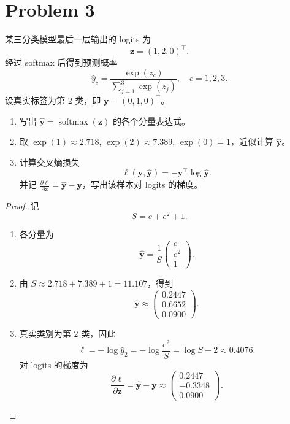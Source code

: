 \section*{Problem 3}

某三分类模型最后一层输出的 logits 为
\[
\bm{z} = (1, 2, 0)^\top.
\]
经过 softmax 后得到预测概率
\[
\hat{y}_c = \frac{\exp(z_c)}{\sum_{j=1}^{3} \exp(z_j)},\quad c = 1, 2, 3.
\]
设真实标签为第 2 类，即 $\bm{y} = (0, 1, 0)^\top$。
\begin{enumerate}
    \item 写出 $\hat{\bm{y}} = \operatorname{softmax}(\bm{z})$ 的各个分量表达式。
    \item 取 $\exp(1) \approx 2.718$, $\exp(2) \approx 7.389$, $\exp(0) = 1$，近似计算 $\hat{\bm{y}}$。
    \item 计算交叉熵损失
    \[
    \ell(\bm{y}, \hat{\bm{y}}) = -\bm{y}^\top \log \hat{\bm{y}}.
    \]
    并记 $\frac{\partial \ell}{\partial \bm{z}} = \hat{\bm{y}} - \bm{y}$，写出该样本对 logits 的梯度。
\end{enumerate}

\begin{proof}
    记
    \[
        S=e+e^2+1.
    \]
    \begin{enumerate}
        \item 各分量为
        \[
            \hat{\bm{y}}
            = \frac{1}{S}\begin{pmatrix}e\\e^2\\1\end{pmatrix}.
        \]
        \item 由 $S\approx2.718+7.389+1=11.107$，得到
        \[
            \hat{\bm{y}}
            \approx \boxed{\begin{pmatrix}0.2447\\0.6652\\0.0900\end{pmatrix}}.
        \]
        \item 真实类别为第 $2$ 类，因此
        \[
            \ell=-\log\hat y_2
            =-\log\frac{e^2}{S}
            =\log S-2
            \approx \boxed{0.4076}.
        \]
        对 logits 的梯度为
        \[
            \frac{\partial\ell}{\partial\bm{z}}
            =\hat{\bm{y}}-\bm{y}
            \approx \boxed{\begin{pmatrix}0.2447\\-0.3348\\0.0900\end{pmatrix}}.
        \]
    \end{enumerate}
\end{proof}
